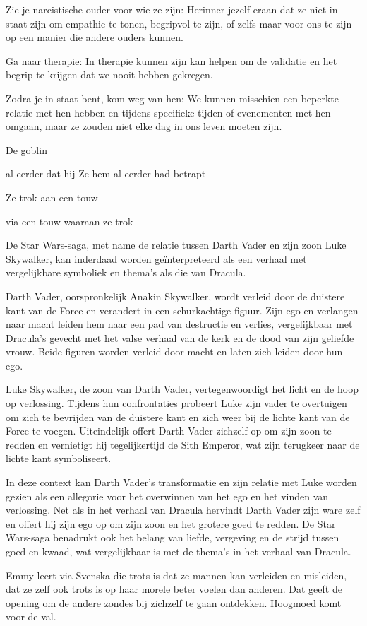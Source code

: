 Zie je narcistische ouder voor wie ze zijn: Herinner jezelf eraan dat ze niet in staat zijn om empathie te tonen, begripvol te zijn, of zelfs maar voor ons te zijn op een manier die andere ouders kunnen.

Ga naar therapie: In therapie kunnen zijn kan helpen om de validatie en het begrip te krijgen dat we nooit hebben gekregen.

Zodra je in staat bent, kom weg van hen: We kunnen misschien een beperkte relatie met hen hebben en tijdens specifieke tijden of evenementen met hen omgaan, maar ze zouden niet elke dag in ons leven moeten zijn.

De goblin

al eerder dat hij
Ze hem al eerder had betrapt

Ze trok aan een touw

via een touw waaraan ze trok

De Star Wars-saga, met name de relatie tussen Darth Vader en zijn zoon Luke Skywalker, kan inderdaad worden geïnterpreteerd als een verhaal met vergelijkbare symboliek en thema's als die van Dracula.

Darth Vader, oorspronkelijk Anakin Skywalker, wordt verleid door de duistere kant van de Force en verandert in een schurkachtige figuur. Zijn ego en verlangen naar macht leiden hem naar een pad van destructie en verlies, vergelijkbaar met Dracula's gevecht met het valse verhaal van de kerk en de dood van zijn geliefde vrouw. Beide figuren worden verleid door macht en laten zich leiden door hun ego.

Luke Skywalker, de zoon van Darth Vader, vertegenwoordigt het licht en de hoop op verlossing. Tijdens hun confrontaties probeert Luke zijn vader te overtuigen om zich te bevrijden van de duistere kant en zich weer bij de lichte kant van de Force te voegen. Uiteindelijk offert Darth Vader zichzelf op om zijn zoon te redden en vernietigt hij tegelijkertijd de Sith Emperor, wat zijn terugkeer naar de lichte kant symboliseert.

In deze context kan Darth Vader's transformatie en zijn relatie met Luke worden gezien als een allegorie voor het overwinnen van het ego en het vinden van verlossing. Net als in het verhaal van Dracula hervindt Darth Vader zijn ware zelf en offert hij zijn ego op om zijn zoon en het grotere goed te redden. De Star Wars-saga benadrukt ook het belang van liefde, vergeving en de strijd tussen goed en kwaad, wat vergelijkbaar is met de thema's in het verhaal van Dracula.

Emmy leert via Svenska die trots is dat ze mannen kan verleiden en misleiden, dat ze zelf ook trots is op haar morele beter voelen dan anderen. Dat geeft de opening om de andere zondes bij zichzelf te gaan ontdekken. Hoogmoed komt voor de val.


